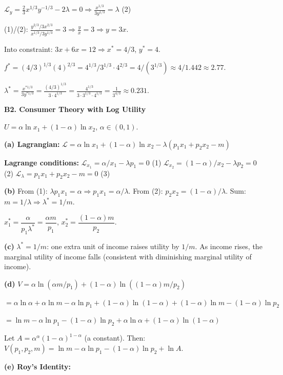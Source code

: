 \documentclass[12pt, a4paper]{article}
\theoremstyle{definition}
\begin{document}
\begin{solbox}
$\mathcal{L}_y=\frac{2}{3}x^{1/3}y^{-1/3}-2\lambda=0 \Rightarrow \frac{x^{1/3}}{3y^{1/3}}=\lambda$ \quad (2)

(1)/(2): $\frac{y^{2/3}/3x^{2/3}}{x^{1/3}/3y^{1/3}} = 3 \Rightarrow \frac{y}{x}=3 \Rightarrow y=3x$.

Into constraint: $3x+6x=12 \Rightarrow x^*=4/3$, $y^*=4$.

$f^*=(4/3)^{1/3}(4)^{2/3}=4^{1/3}/3^{1/3}\cdot 4^{2/3}=4/(3^{1/3})\approx 4/1.442\approx 2.77$.

$\lambda^* = \frac{x^{*1/3}}{3y^{*1/3}}
= \frac{(4/3)^{1/3}}{3\cdot 4^{1/3}}
= \frac{4^{1/3}}{3\cdot 3^{1/3}\cdot 4^{1/3}}
= \frac{1}{3^{4/3}} \approx 0.231$.
\end{solbox}

\begin{solbox}
\textbf{B2. Consumer Theory with Log Utility}

$U = \alpha\ln x_1+(1-\alpha)\ln x_2$, $\alpha\in(0,1)$.

\textbf{(a) Lagrangian:}
$\mathcal{L}=\alpha\ln x_1+(1-\alpha)\ln x_2-\lambda(p_1x_1+p_2x_2-m)$

\textbf{Lagrange conditions:}
$\mathcal{L}_{x_1} = \alpha/x_1 - \lambda p_1 = 0$ \quad (1)
$\mathcal{L}_{x_2} = (1-\alpha)/x_2 - \lambda p_2 = 0$ \quad (2)
$\mathcal{L}_\lambda = p_1x_1+p_2x_2-m=0$ \quad (3)

\textbf{(b)} From (1): $\lambda p_1 x_1 = \alpha \Rightarrow p_1 x_1 = \alpha/\lambda$.
From (2): $p_2 x_2 = (1-\alpha)/\lambda$.
Sum: $m = 1/\lambda \Rightarrow \lambda^* = 1/m$.

$x_1^* = \dfrac{\alpha}{p_1\lambda^*} = \dfrac{\alpha m}{p_1}$,\quad
$x_2^* = \dfrac{(1-\alpha)m}{p_2}$.

\textbf{(c)} $\lambda^* = 1/m$: one extra unit of income raises utility by $1/m$. As income rises, the marginal utility of income falls (consistent with diminishing marginal utility of income).

\textbf{(d)} $V = \alpha\ln(\alpha m/p_1) + (1-\alpha)\ln((1-\alpha)m/p_2)$

$= \alpha\ln\alpha + \alpha\ln m - \alpha\ln p_1 + (1-\alpha)\ln(1-\alpha)
+ (1-\alpha)\ln m - (1-\alpha)\ln p_2$

$= \ln m - \alpha\ln p_1 - (1-\alpha)\ln p_2
+ \alpha\ln\alpha + (1-\alpha)\ln(1-\alpha)$

Let $A = \alpha^\alpha(1-\alpha)^{1-\alpha}$ (a constant). Then:
$V(p_1,p_2,m) = \ln m - \alpha\ln p_1 - (1-\alpha)\ln p_2 + \ln A$.

\textbf{(e) Roy's Identity:}


\end{solbox}
\end{document}
